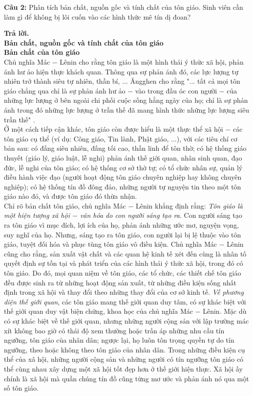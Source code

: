 \begin{mybox}
\textbf{Câu 2:} Phân tích bản chất, nguồn gốc và tính chất của tôn giáo. Sinh viên cần làm gì để không bị lôi cuốn vào các hình thức mê tín dị đoan?
\end{mybox}
\textbf{Trả lời.}\\
\textbf{Bản chất, nguồn gốc và tính chất của tôn giáo}\\
\textbf{Bản chất của tôn giáo}\\
Chủ nghĩa Mác $-$ Lênin cho rằng tôn giáo là một hình thái ý thức xã hội, phản ánh hư ảo hiện thực khách quan. Thông qua sự phản ánh đó, các lực lượng tự nhiên trở thành siêu tự nhiên, thần bí, ... Ăngghen cho rằng "... tất cả mọi tôn giáo chẳng qua chỉ là sự phản ánh hư ảo $-$ vào trong đầu óc con người $-$ của những lực lượng ở bên ngoài chi phối cuộc sống hằng ngày của họ; chỉ là sự phản ánh trong đó những lực lượng ở trần thế đã mang hình thức những lực lượng siêu trần thế" \supercite{Mac20}.\\
Ở một cách tiếp cận khác, tôn giáo còn được hiểu là một thực thể xã hội $-$ các tôn giáo cụ thể (ví dụ: Công giáo, Tin lành, Phật giáo, ...), với các tiêu chí cơ bản sau: có đấng siêu nhiên, đấng tối cao, thần linh để tôn thờ; có hệ thống giáo thuyết (giáo lý, giáo luật, lễ nghi) phản ánh thế giới quan, nhân sinh quan, đạo đức, lễ nghi của tôn giáo; có hệ thống cơ sở thờ tự; có tổ chức nhân sự, quản lý điều hành việc đạo (người hoạt động tôn giáo chuyên nghiệp hay không chuyên nghiệp); có hệ thống tín đồ đông đảo, những người tự nguyện tin theo một tôn giáo nào đó, và được tôn giáo đó thừa nhận.\\
Chỉ rõ bản chất tôn giáo, chủ nghĩa Mác $-$ Lênin khẳng định rằng: \textit{Tôn giáo là một hiện tượng xã hội $-$ văn hóa do con người sáng tạo ra}. Con người sáng tạo ra tôn giáo vì mục đích, lợi ích của họ, phản ánh những ước mơ, nguyện vọng, suy nghĩ của họ. Nhưng, sáng tạo ra tôn giáo, con người lại bị lệ thuộc vào tôn giáo, tuyệt đối hóa và phục tùng tôn giáo vô điều kiện. Chủ nghĩa Mác $-$ Lênin cũng cho rằng, sản xuất vật chất và các quan hệ kinh tế xét đến cùng là nhân tố quyết định sự tồn tại và phát triển của các hình thái ý thức xã hội, trong đó có tôn giáo. Do đó, mọi quan niệm về tôn giáo, các tổ chức, các thiết chế tôn giáo đều được sinh ra từ những hoạt động sản xuất, từ những điều kiện sống nhất định trong xã hội và thay đổi theo những thay đổi của cơ sở kinh tế. \textit{Về phương diện thế giới quan}, các tôn giáo mang thế giới quan duy tâm, có sự khác biệt với thế giới quan duy vật biện chứng, khoa học của chủ nghĩa Mác $-$ Lênin. Mặc dù có sự khác biệt về thế giới quan, nhưng những người cộng sản với lập trường mác xít không bao giờ có thái độ xem thường hoặc trấn áp những nhu cầu tín ngưỡng, tôn giáo của nhân dân; ngược lại, họ luôn tôn trọng quyền tự do tín ngưỡng, theo hoặc không theo tôn giáo của nhân dân. Trong những điều kiện cụ thể của xã hội, những người cộng sản và những người có tín ngưỡng tôn giáo có thể cùng nhau xây dựng một xã hội tốt đẹp hơn ở thế giới hiện thực. Xã hội ấy chính là xã hội mà quần chúng tín đồ cũng từng mơ ước và phản ánh nó qua một số tôn giáo.\\
